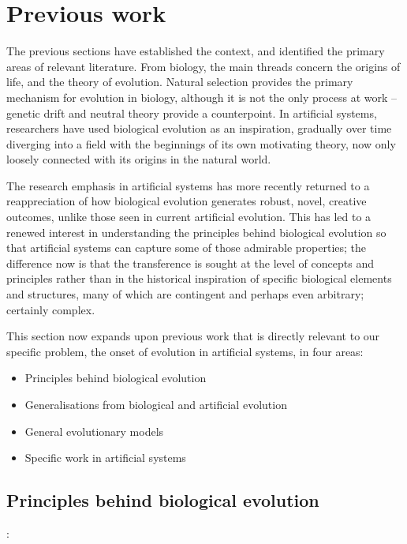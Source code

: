 \chapter{Previous work}

The previous sections have established the context, and identified the primary areas of relevant literature. From biology, the main threads concern the origins of life, and the theory of evolution. Natural selection provides the primary mechanism for evolution in biology, although it is not the only process at work -- genetic drift and neutral theory provide a counterpoint. In artificial systems, researchers have used biological evolution as an inspiration, gradually over time diverging into a field with the beginnings of its own motivating theory, now only loosely connected with its origins in the natural world.

The research emphasis in artificial systems has more recently returned to a reappreciation of how biological evolution generates robust, novel, creative outcomes, unlike those seen in current artificial evolution. This has led to a renewed interest in understanding the principles behind biological evolution so that artificial systems can capture some of those admirable properties; the difference now is that the transference is sought at the level of concepts and principles rather than in the historical inspiration of specific biological elements and structures, many of which are contingent and perhaps even arbitrary; certainly complex.

This section now expands upon previous work that is directly relevant to our specific problem, the onset of evolution in artificial systems, in four areas:

\begin{itemize}
	\item Principles behind biological evolution
	\item Generalisations from biological and artificial evolution
	\item General evolutionary models
	\item Specific work in artificial systems
\end{itemize}

\section{Principles behind biological evolution}

\autocite{Watson2012}:

